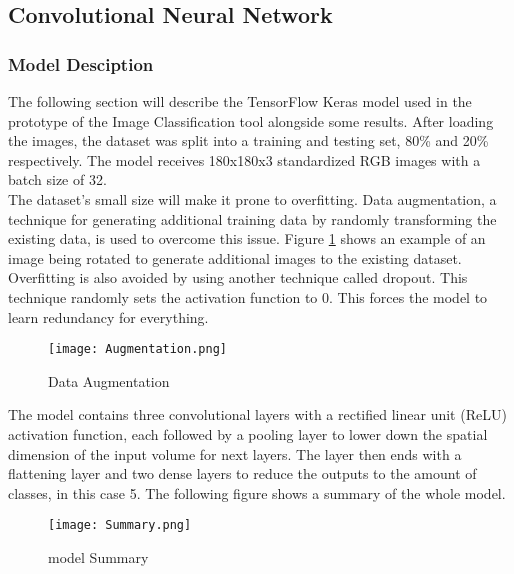 \subsection{Convolutional Neural Network}
    \subsubsection{Model Desciption}
        The following section will describe the TensorFlow Keras
        \cite{tensorflow2015-whitepaper} model used in the prototype of the
        Image Classification tool alongside some results.  
        After  loading  the  images,  the  dataset  was  split  into  a
        training and testing set, 80\% and 20\% respectively. The model
        receives 180x180x3 standardized RGB images with a batch size of
        32. \\
        The dataset’s small size will make it prone to overfitting.
        Data augmentation,  a technique for generating additional training
        data by randomly transforming the existing data, is used to
        overcome this issue. Figure \ref{augmentation} shows an example of an image  being
        rotated to generate additional images to the existing dataset.
        Overfitting is also avoided by using another technique called
        dropout. This technique randomly sets the activation function to
        0. This forces the model to learn redundancy for everything. \\

        \begin{figure}[H]
            \caption{Data Augmentation}
            \centering
            \texttt{[image: Augmentation.png]}
            \label{augmentation}
        \end{figure}

        The model contains three convolutional layers with a rectified linear
        unit (ReLU) activation function, each followed by a pooling layer
        to lower down the spatial dimension of the input volume for next
        layers. The layer then ends with a flattening layer and two dense
        layers to reduce the outputs to the amount of classes, in this
        case 5. The following figure shows a summary of the whole model.

        \begin{figure}[H]
            \caption{model Summary}
            \centering
            \texttt{[image: Summary.png]}
            \label{summary}
        \end{figure}

